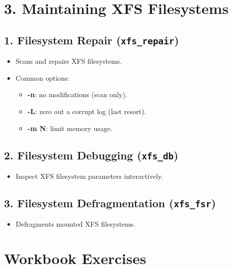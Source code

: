 \documentclass[a4paper]{report}
\begin{document}
\section*{3. Maintaining XFS Filesystems}

\subsection*{1. Filesystem Repair (\texttt{xfs\_repair})}
\begin{itemize}
    \item Scans and repairs XFS filesystems.
    \item Common options:
    \begin{itemize}
        \item \textbf{-n}: no modifications (scan only).
        \item \textbf{-L}: zero out a corrupt log (last resort).
        \item \textbf{-m N}: limit memory usage.
    \end{itemize}
\end{itemize}

\subsection*{2. Filesystem Debugging (\texttt{xfs\_db})}
\begin{itemize}
    \item Inspect XFS filesystem parameters interactively.
\end{itemize}

\subsection*{3. Filesystem Defragmentation (\texttt{xfs\_fsr})}
\begin{itemize}
    \item Defragments mounted XFS filesystems.
\end{itemize}

\section*{Workbook Exercises}
\end{document}
